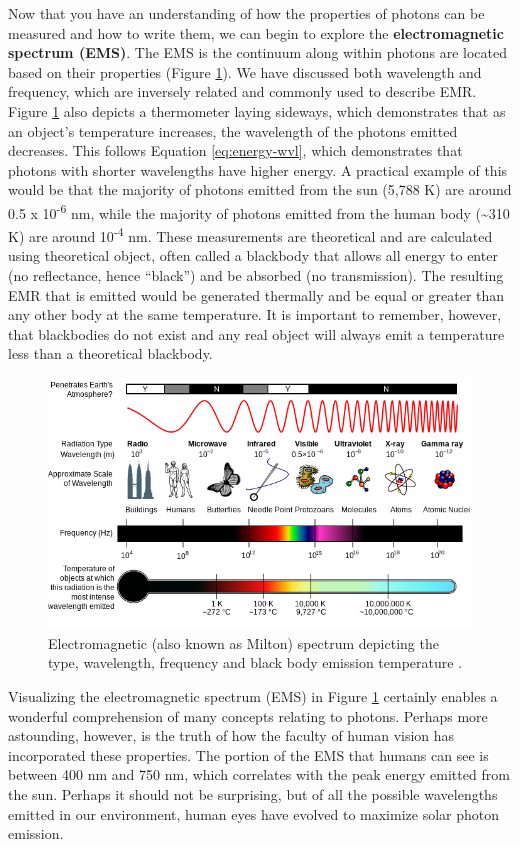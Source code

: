 \documentclass[
]{book}
\begin{document}
Now that you have an understanding of how the properties of photons can be measured and how to write them, we can begin to explore the \textbf{electromagnetic spectrum (EMS)}. The EMS is the continuum along within photons are located based on their properties (Figure \ref{fig:11-EMS}). We have discussed both wavelength and frequency, which are inversely related and commonly used to describe EMR. Figure \ref{fig:11-EMS} also depicts a thermometer laying sideways, which demonstrates that as an object's temperature increases, the wavelength of the photons emitted decreases. This follows Equation \eqref{eq:energy-wvl}, which demonstrates that photons with shorter wavelengths have higher energy. A practical example of this would be that the majority of photons emitted from the sun (5,788 K) are around 0.5 x 10\textsuperscript{-6} nm, while the majority of photons emitted from the human body (\textasciitilde310 K) are around 10\textsuperscript{-4} nm. These measurements are theoretical and are calculated using theoretical object, often called a blackbody that allows all energy to enter (no reflectance, hence ``black'') and be absorbed (no transmission). The resulting EMR that is emitted would be generated thermally and be equal or greater than any other body at the same temperature. It is important to remember, however, that blackbodies do not exist and any real object will always emit a temperature less than a theoretical blackbody.



\begin{figure}
\includegraphics[width=0.75\linewidth]{images/11-EMS} \caption{Electromagnetic (also known as Milton) spectrum depicting the type, wavelength, frequency and black body emission temperature \citep{inductiveload_em_2007}.}\label{fig:11-EMS}
\end{figure}

Visualizing the electromagnetic spectrum (EMS) in Figure \ref{fig:11-EMS} certainly enables a wonderful comprehension of many concepts relating to photons. Perhaps more astounding, however, is the truth of how the faculty of human vision has incorporated these properties. The portion of the EMS that humans can see is between 400 nm and 750 nm, which correlates with the peak energy emitted from the sun. Perhaps it should not be surprising, but of all the possible wavelengths emitted in our environment, human eyes have evolved to maximize solar photon emission.
\end{document}
